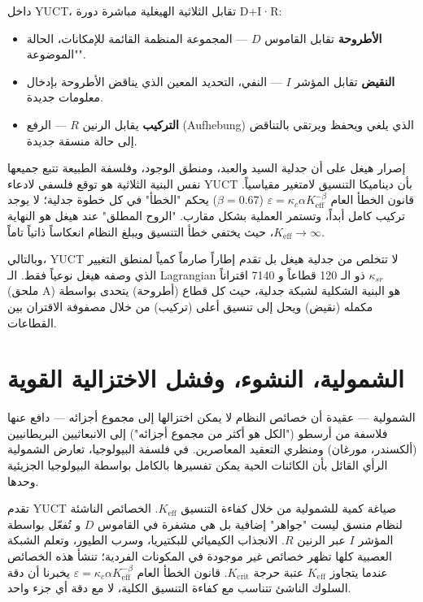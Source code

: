 \documentclass[12pt,a4paper]{article}
\begin{document}
	داخل YUCT، تقابل الثلاثية الهيغلية مباشرة دورة D+I·R:
	\begin{itemize}
		\item \textbf{الأطروحة} تقابل القاموس \(D\) — المجموعة المنظمة القائمة للإمكانات، الحالة "الموضوعة".
		\item \textbf{النقيض} تقابل المؤشر \(I\) — النفي، التحديد المعين الذي يناقض الأطروحة بإدخال معلومات جديدة.
		\item \textbf{التركيب} يقابل الرنين \(R\) — الرفع (Aufhebung) الذي يلغي ويحفظ ويرتقي بالتناقض إلى حالة منسقة جديدة.
	\end{itemize}
	
	إصرار هيغل على أن جدلية السيد والعبد، ومنطق الوجود، وفلسفة الطبيعة تتبع جميعها نفس البنية الثلاثية هو توقع فلسفي لادعاء YUCT بأن ديناميكا التنسيق لامتغير مقياسياً. قانون الخطأ العام \(\varepsilon = \kappa_c \alpha K_{\mathrm{eff}}^{-\beta}\) (\(\beta=0.67\)) يحكم "الخطأ" في كل خطوة جدلية؛ لا يوجد تركيب كامل أبداً، وتستمر العملية بشكل مقارب. "الروح المطلق" عند هيغل هو النهاية \(K_{\mathrm{eff}} \to \infty\)، حيث يختفي خطأ التنسيق ويبلغ النظام انعكاساً ذاتياً تاماً.
	
	وبالتالي، YUCT لا تتخلص من جدلية هيغل بل تقدم إطاراً صارماً كمياً لمنطق التغيير الذي وصفه هيغل نوعياً فقط. الـ Lagrangian ذو الـ 120 قطاعاً و 7140 اقتراناً \(\kappa_{sr}\) (ملحق A) هو البنية الشكلية لشبكة جدلية، حيث كل قطاع (أطروحة) يتحدى بواسطة مكمله (نقيض) ويحل إلى تنسيق أعلى (تركيب) من خلال مصفوفة الاقتران بين القطاعات.
	
	\section{الشمولية، النشوء، وفشل الاختزالية القوية}
	
	الشمولية — عقيدة أن خصائص النظام لا يمكن اختزالها إلى مجموع أجزائه — دافع عنها فلاسفة من أرسطو ("الكل هو أكثر من مجموع أجزائه") إلى الانبعاثيين البريطانيين (ألكسندر، مورغان) ومنظري التعقيد المعاصرين. في فلسفة البيولوجيا، تعارض الشمولية الرأي القائل بأن الكائنات الحية يمكن تفسيرها بالكامل بواسطة البيولوجيا الجزيئية وحدها.
	
	تقدم YUCT صياغة كمية للشمولية من خلال كفاءة التنسيق \(K_{\mathrm{eff}}\). الخصائص الناشئة لنظام منسق ليست "جواهر" إضافية بل هي مشفرة في القاموس \(D\) و تُفعّل بواسطة المؤشر \(I\) عبر الرنين \(R\). الانجذاب الكيميائي للبكتيريا، وسرب الطيور، وتعلم الشبكة العصبية كلها تظهر خصائص غير موجودة في المكونات الفردية؛ تنشأ هذه الخصائص عندما يتجاوز \(K_{\mathrm{eff}}\) عتبة حرجة \(K_{\mathrm{crit}}\). قانون الخطأ العام \(\varepsilon = \kappa_c \alpha K_{\mathrm{eff}}^{-\beta}\) يخبرنا أن دقة السلوك الناشئ تتناسب مع كفاءة التنسيق الكلية، لا مع دقة أي جزء واحد.
	
\end{document}
